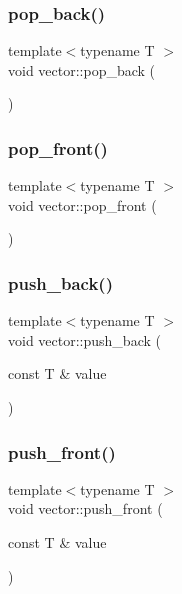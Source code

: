 \subsubsection{\texorpdfstring{pop\+\_\+back()}{pop\_back()}}
{\footnotesize\ttfamily template$<$typename T $>$ \\
void vector\+::pop\+\_\+back (\begin{DoxyParamCaption}{ }\end{DoxyParamCaption})}

\mbox{\label{classsc_1_1vector_abd1b780aa2d88a981e36ca6cc40c2e51}} 
\subsubsection{\texorpdfstring{pop\+\_\+front()}{pop\_front()}}
{\footnotesize\ttfamily template$<$typename T $>$ \\
void vector\+::pop\+\_\+front (\begin{DoxyParamCaption}{ }\end{DoxyParamCaption})}

\mbox{\label{classsc_1_1vector_a4cf27b8604e2465550bcc2f36405d3dc}} 
\subsubsection{\texorpdfstring{push\+\_\+back()}{push\_back()}}
{\footnotesize\ttfamily template$<$typename T $>$ \\
void vector\+::push\+\_\+back (\begin{DoxyParamCaption}\item[{const T \&}]{value }\end{DoxyParamCaption})}

\mbox{\label{classsc_1_1vector_a6af9e24185373de9b47507cb868667fe}} 
\subsubsection{\texorpdfstring{push\+\_\+front()}{push\_front()}}
{\footnotesize\ttfamily template$<$typename T $>$ \\
void vector\+::push\+\_\+front (\begin{DoxyParamCaption}\item[{const T \&}]{value }\end{DoxyParamCaption})}

